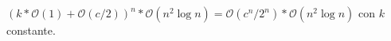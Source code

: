 \begin{center}
$(k*\mathcal{O}(1) + \mathcal{O}(c/2))^n * \mathcal{O}(n^2 \log{n}) = \mathcal{O}(c^n/2^n) * \mathcal{O}(n^2 \log{n})$ con $k$ constante.
\end{center}



